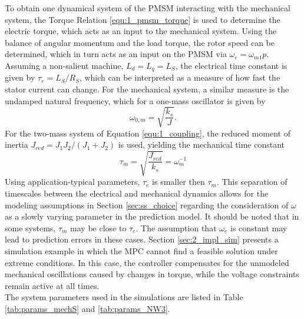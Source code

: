 To obtain one dynamical system of the PMSM interacting with the mechanical system, the Torque Relation \eqref{equ:1_pmsm_torque} is used to determine the electric torque, which acts as an input to the mechanical system. Using the balance of angular momentum and the load torque, the rotor speed can be determined, which in turn acts as an input on the PMSM via $\omega_e = \omega_{m1}p$.\\
Assuming a non-salient machine, $L_d = L_q = L_S$, the electrical time constant is given by $\tau_e = L_S/R_S$, which can be interpreted as a measure of how fast the stator current can change. For the mechanical system, a similar measure is the undamped natural frequency, which for a one-mass oscillator is given by
\[
\omega_{0,m} = \sqrt{\frac{k_s}{J}}.
\]
For the two-mass system of Equation \eqref{equ:1_coupling}, the reduced moment of inertia $J_{red} = J_1J_2/(J_1+J_2)$ is used, yielding the mechanical time constant
\[
\tau_{m} = \sqrt{\frac{J_{red}}{k_s}} = \omega_{m}^{-1}
\]
Using application-typical parameters, $\tau_e$ is smaller then $\tau_m$. This separation of timescales between the electrical and mechanical dynamics allows for the modeling assumptions in Section \ref{sec:ss_choice} regarding the consideration of $\omega$ as a slowly varying parameter in the prediction model. It should be noted that in some systems, $\tau_m$ may be close to $\tau_e$. The assumption that $\omega_e$ is constant may lead to prediction errors in these cases. Section \ref{sec:2_impl_sim} presents a simulation example in which the MPC cannot find a feasible solution under extreme conditions. In this case, the controller compensates for the unmodeled mechanical oscillations caused by changes in torque, while the voltage constraints remain active at all times.\\
The system parameters used in the simulations are listed in Table \ref{tab:params_mechS} and \ref{tab:params_NW3}.



